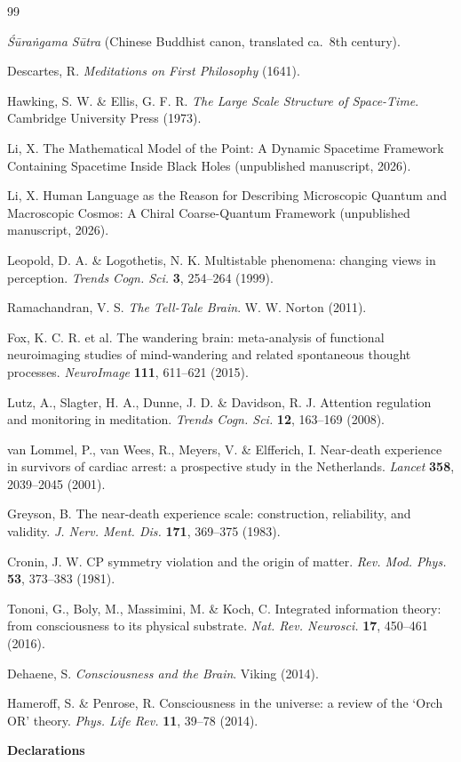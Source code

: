 \documentclass[11pt,a4paper]{article}
\begin{document}
\begin{thebibliography}{99}

\textit{Śūraṅgama Sūtra} (Chinese Buddhist canon, translated ca.~8th century).

Descartes, R. \textit{Meditations on First Philosophy} (1641).

Hawking, S. W. \& Ellis, G. F. R. \textit{The Large Scale Structure of Space-Time}. Cambridge University Press (1973).

Li, X. The Mathematical Model of the Point: A Dynamic Spacetime Framework Containing Spacetime Inside Black Holes (unpublished manuscript, 2026).

Li, X. Human Language as the Reason for Describing Microscopic Quantum and Macroscopic Cosmos: A Chiral Coarse-Quantum Framework (unpublished manuscript, 2026).

Leopold, D. A. \& Logothetis, N. K. Multistable phenomena: changing views in perception. \textit{Trends Cogn. Sci.} \textbf{3}, 254--264 (1999).

Ramachandran, V. S. \textit{The Tell-Tale Brain}. W. W. Norton (2011).

Fox, K. C. R. et al. The wandering brain: meta-analysis of functional neuroimaging studies of mind-wandering and related spontaneous thought processes. \textit{NeuroImage} \textbf{111}, 611--621 (2015).

Lutz, A., Slagter, H. A., Dunne, J. D. \& Davidson, R. J. Attention regulation and monitoring in meditation. \textit{Trends Cogn. Sci.} \textbf{12}, 163--169 (2008).

van Lommel, P., van Wees, R., Meyers, V. \& Elfferich, I. Near-death experience in survivors of cardiac arrest: a prospective study in the Netherlands. \textit{Lancet} \textbf{358}, 2039--2045 (2001).

Greyson, B. The near-death experience scale: construction, reliability, and validity. \textit{J. Nerv. Ment. Dis.} \textbf{171}, 369--375 (1983).

Cronin, J. W. CP symmetry violation and the origin of matter. \textit{Rev. Mod. Phys.} \textbf{53}, 373--383 (1981).

Tononi, G., Boly, M., Massimini, M. \& Koch, C. Integrated information theory: from consciousness to its physical substrate. \textit{Nat. Rev. Neurosci.} \textbf{17}, 450--461 (2016).

Dehaene, S. \textit{Consciousness and the Brain}. Viking (2014).

Hameroff, S. \& Penrose, R. Consciousness in the universe: a review of the `Orch OR' theory. \textit{Phys. Life Rev.} \textbf{11}, 39--78 (2014).

\end{thebibliography}
\textbf{\textbf{Declarations}}
\end{document}
